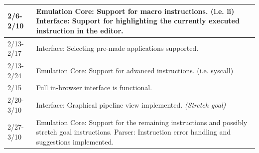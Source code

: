 \documentclass[
    paper=letter,
    parskip=half,
    fontsize=12pt,
    titlepage=firstiscover,
    toc=bibliography,
    numbers=endperiod
]{scrartcl}
\begin{document}
{\begin{tabularx}{\textwidth}{|l|X|}
        2/6-2/10      & Emulation Core: Support for macro instructions. (i.e. li) \newline Interface: Support for highlighting the currently executed instruction in the editor.                                                                                                                                                                                                                                                                             \\\hline
        2/13-2/17     & Interface: Selecting pre-made applications supported.                                                                                                                                                                                                                                                                                                                                                                                \\\hline
        2/13-2/24     & Emulation Core: Support for advanced instructions. (i.e. syscall)                                                                                                                                                                                                                                                                                                                                                                    \\\hline
        2/15          & Full in-browser interface is functional.                                                                                                                                                                                                                                                                                                                                                                                             \\\hline
        2/20-3/10     & Interface: Graphical pipeline view implemented. \emph{(Stretch goal)}                                                                                                                                                                                                                                                                                                                                                                \\\hline
        2/27-3/10     & Emulation Core: Support for the remaining instructions and possibly stretch goal instructions. \newline Parser: Instruction error handling and suggestions implemented.                                                                                                                                                                                                                                                              \\\hline

\end{tabularx}}
\end{document}
